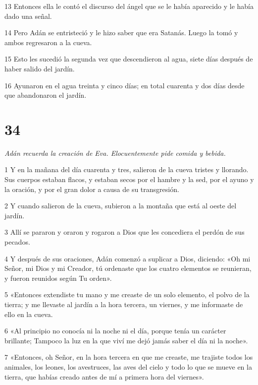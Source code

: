 \par 13 Entonces ella le contó el discurso del ángel que se le había aparecido y le había dado una señal.

\par 14 Pero Adán se entristeció y le hizo saber que era Satanás. Luego la tomó y ambos regresaron a la cueva.

\par 15 Esto les sucedió la segunda vez que descendieron al agua, siete días después de haber salido del jardín.

\par 16 Ayunaron en el agua treinta y cinco días; en total cuarenta y dos días desde que abandonaron el jardín.

\chapter{34}

\par \textit{Adán recuerda la creación de Eva. Elocuentemente pide comida y bebida.}

\par 1 Y en la mañana del día cuarenta y tres, salieron de la cueva tristes y llorando. Sus cuerpos estaban flacos, y estaban secos por el hambre y la sed, por el ayuno y la oración, y por el gran dolor a causa de su transgresión.

\par 2 Y cuando salieron de la cueva, subieron a la montaña que está al oeste del jardín.

\par 3 Allí se pararon y oraron y rogaron a Dios que les concediera el perdón de sus pecados.

\par 4 Y después de sus oraciones, Adán comenzó a suplicar a Dios, diciendo: «Oh mi Señor, mi Dios y mi Creador, tú ordenaste que los cuatro elementos se reunieran, y fueron reunidos según Tu orden».

\par 5 «Entonces extendiste tu mano y me creaste de un solo elemento, el polvo de la tierra; y me llevaste al jardín a la hora tercera, un viernes, y me informaste de ello en la cueva.

\par 6 «Al principio no conocía ni la noche ni el día, porque tenía un carácter brillante; Tampoco la luz en la que viví me dejó jamás saber el día ni la noche».

\par 7 «Entonces, oh Señor, en la hora tercera en que me creaste, me trajiste todos los animales, los leones, los avestruces, las aves del cielo y todo lo que se mueve en la tierra, que habías creado antes de mí a primera hora del viernes».

